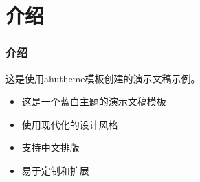 
\section{介绍}
\begin{frame}
\frametitle{介绍}
这是使用ahutheme模板创建的演示文稿示例。

\begin{itemize}
  \item 这是一个蓝白主题的演示文稿模板
  \item 使用现代化的设计风格
  \item 支持中文排版
  \item 易于定制和扩展
\end{itemize}
\end{frame}